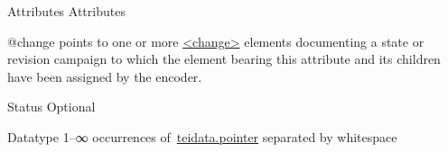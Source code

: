 \begin{reflist}
    \item[{Attributes}]
  Attributes\hfil\\[-10pt]\begin{sansreflist}
    \item[@change]
  points to one or more \hyperref[TEI.change]{<change>} elements documenting a state or revision campaign to which the element bearing this attribute and its children have been assigned by the encoder.
\begin{reflist}
    \item[{Status}]
  Optional
    \item[{Datatype}]
  1–∞ occurrences of \hyperref[TEI.teidata.pointer]{teidata.pointer} separated by whitespace
\end{reflist}  
\end{sansreflist}  
\end{reflist}  
